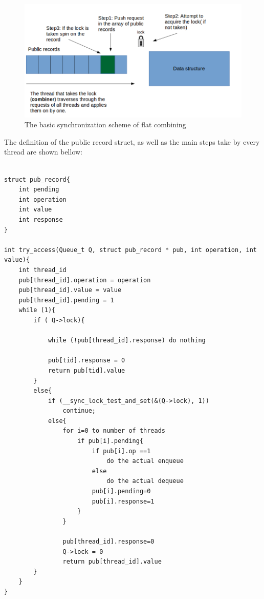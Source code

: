 \begin{figure}
 \centering
  \includegraphics[scale=0.7]{flat_combining_basic.png}
\caption{The basic synchronization scheme of flat combining}
\label{flat_combining_basic}
\end{figure}

The definition of the public record struct, as well as the main steps take by every thread are shown bellow:

\begin{lstlisting}

struct pub_record{
	int pending
	int operation
	int value
	int response
} 

int try_access(Queue_t Q, struct pub_record * pub, int operation, int value){
	int thread_id
	pub[thread_id].operation = operation
	pub[thread_id].value = value
	pub[thread_id].pending = 1
	while (1){
		if ( Q->lock){

			while (!pub[thread_id].response) do nothing
			
			pub[tid].response = 0
			return pub[tid].value
		}
		else{
			if (__sync_lock_test_and_set(&(Q->lock), 1)) 
				continue;
			else{
				for i=0 to number of threads
					if pub[i].pending{
						if pub[i].op ==1
							do the actual enqueue
						else
							do the actual dequeue
						pub[i].pending=0
						pub[i].response=1
					}
				}
				
				pub[thread_id].response=0
				Q->lock = 0
				return pub[thread_id].value
		}
	}
}				

\end{lstlisting}


